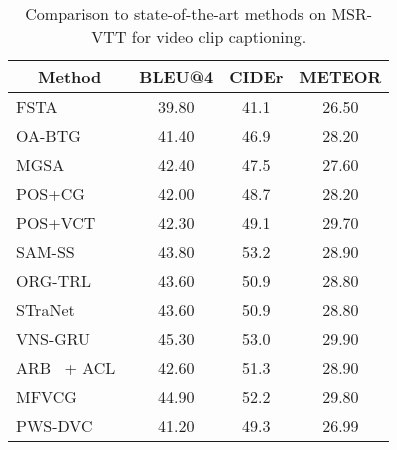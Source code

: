 \begin{table}[tp]
    \centering
    \begin{tabular}{l|ccc}
        \hline
        \multicolumn{1}{c|}{Method}                   & \multicolumn{1}{c}{BLEU@4} & \multicolumn{1}{c}{CIDEr} & \multicolumn{1}{c}{METEOR} \\ \hline
        FSTA~\cite{Liu2018-pg}                        & 39.80                      & 41.1                      & 26.50                      \\
        OA-BTG~\cite{Zhang2019-kb}                    & 41.40                      & 46.9                      & 28.20                      \\
        MGSA~\cite{Chen2019-po}                       & 42.40                      & 47.5                      & 27.60                      \\
        POS+CG~\cite{Wang2019-dh}                     & 42.00                      & 48.7                      & 28.20                      \\
        POS+VCT~\cite{Hou2019-ox}                     & 42.30                      & 49.1                      & 29.70                      \\
        SAM-SS~\cite{Chen2020-di}                     & 43.80                      & 53.2                      & 28.90                      \\
        ORG-TRL~\cite{Zhang2020-rl}                   & 43.60                      & 50.9                      & 28.80                      \\
        STraNet~\cite{Zhang2020-rl}                   & 43.60                      & 50.9                      & 28.80                      \\
        VNS-GRU~\cite{Chen2020-iy}                    & 45.30                      & 53.0                      & 29.90                      \\
        ARB~\cite{Yang2021-xf} + ACL~\cite{Li2022-uh} & 42.60                      & 51.3                      & 28.90                      \\
        MFVCG~\cite{Bhooshan2022-ex}                  & 44.90                      & 52.2                      & 29.80                      \\ \hline
        PWS-DVC                                       & 41.20                      & 49.3                      & 26.99                      \\ \hline
    \end{tabular}
    \caption{Comparison to state-of-the-art methods on MSR-VTT for video clip captioning.}
    \label{tab:clip-captioning}
\end{table}

